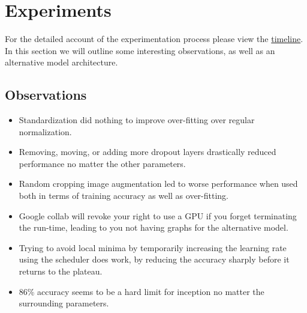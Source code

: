 \documentclass[10pt,twocolumn,letterpaper]{article}
\begin{document}
\section{Experiments}
For the detailed account of the experimentation process please view the \href{https://github.com/XarsEvandor/Machine-Learning-CIFAR10/blob/main/Captain's\%20Log.md}{timeline}. In this section we will outline some interesting observations, as well as an alternative model architecture.

\subsection{Observations}
\begin{itemize}
    \item Standardization did nothing to improve over-fitting over regular normalization.
    \item Removing, moving, or adding more dropout layers drastically reduced performance no matter the other parameters.
    \item Random cropping image augmentation led to worse performance when used both in terms of training accuracy as well as over-fitting.
    \item Google collab will revoke your right to use a GPU if you forget terminating the run-time, leading to you not having graphs for the alternative model.
    \item Trying to avoid local minima by temporarily increasing the learning rate using the scheduler does work, by reducing the accuracy sharply before it returns to the plateau.
    \item 86\% accuracy seems to be a hard limit for inception no matter the surrounding parameters.
\end{itemize}
\end{document}
